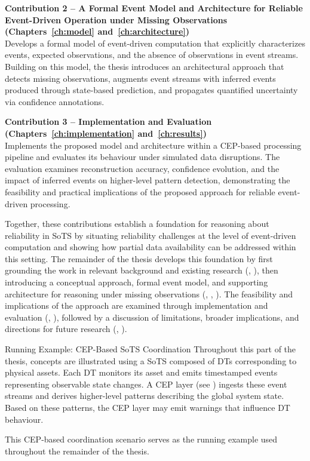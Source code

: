 \textbf{Contribution 2 – A Formal Event Model and Architecture for Reliable Event-Driven Operation under Missing Observations (Chapters~\ref{ch:model} and~\ref{ch:architecture})} \\
Develops a formal model of event-driven computation that explicitly characterizes events, expected observations, and the absence of observations in event streams. Building on this model, the thesis introduces an architectural approach that detects missing observations, augments event streams with inferred events produced through state-based prediction, and propagates quantified uncertainty via confidence annotations.

\textbf{Contribution 3 – Implementation and Evaluation (Chapters~\ref{ch:implementation} and~\ref{ch:results})} \\
Implements the proposed model and architecture within a CEP-based processing pipeline and evaluates its behaviour under simulated data disruptions. The evaluation examines reconstruction accuracy, confidence evolution, and the impact of inferred events on higher-level pattern detection, demonstrating the feasibility and practical implications of the proposed approach for reliable event-driven processing.


\vspace{1em}
Together, these contributions establish a foundation for reasoning about reliability in SoTS by situating reliability challenges at the level of event-driven computation and showing how partial data availability can be addressed within this setting. The remainder of the thesis develops this foundation by first grounding the work in relevant background and existing research (, ), then introducing a conceptual approach, formal event model, and supporting architecture for reasoning under missing observations (, , ). The feasibility and implications of the approach are examined through implementation and evaluation (, ), followed by a discussion of limitations, broader implications, and directions for future research (, ).


\begin{runningexample}{Running Example: CEP-Based SoTS Coordination}
Throughout this part of the thesis, concepts are illustrated using a SoTS composed of DTs corresponding to physical assets. Each DT monitors its asset and emits timestamped events representing observable state changes. A CEP layer (see ) ingests these event streams and derives higher-level patterns describing the global system state. Based on these patterns, the CEP layer may emit warnings that influence DT behaviour.

\begin{center}

\end{center}

This CEP-based coordination scenario serves as the running example used throughout the remainder of the thesis.
\end{runningexample}